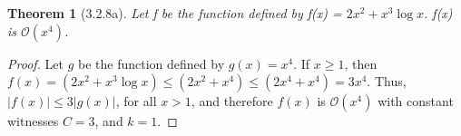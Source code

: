 \documentclass[a4paper, 12pt]{article}
\theoremstyle{plain}
\newtheorem*{theorem*}{Theorem}
\begin{document}
	
	\begin{theorem*}[3.2.8a]
		Let f be the function defined by f(x) = $2x^{2} + x^{3} \log x$. \newline f(x) is $\mathcal{O}(x^{4})$.
	\end{theorem*}
	
	\begin{proof}
		Let $g$ be the function defined by $g(x) = x^{4}$. If $x \ge 1$, then
		\newline \newline \indent \indent
		$f(x) = \left( 2x^{2} + x^{3} \log x \right) \le \left( 2x^{2} + x^{4} \right) \le \left( 2x^{4} + x^{4} \right) = 3x^{4}$. \newline \newline Thus, $|f(x)| \le 3|g(x)|$, for all $x > 1$, and therefore $f(x)$ is $\mathcal{O}(x^{4})$ with constant witnesses $C = 3$, and $k = 1$.
	\end{proof}
\end{document}
